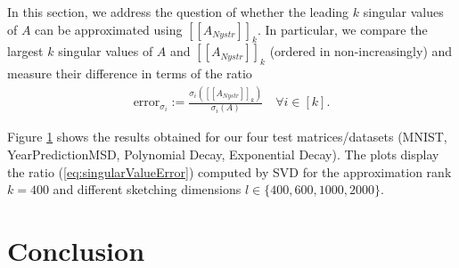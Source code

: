 \documentclass{article}
\theoremstyle{definition}
\begin{document}
In this section, we address the question of whether the leading $k$ singular values of $A$ can be approximated using $[\![A_{Nystr}]\!]_k$. In particular, we compare the largest $k$ singular values of $A$ and $[\![A_{Nystr}]\!]_k$ (ordered in non-increasingly) and measure their difference in terms of the ratio
\begin{align}
    \label{eq:singularValueError}
    \text{error}_{\sigma_i} := \frac{\sigma_i([\![A_{Nystr}]\!]_k)}{\sigma_i(A)}
    \quad \forall i \in [k].
\end{align}

Figure \ref{} shows the results obtained for our four test matrices/datasets (MNIST, YearPredictionMSD, Polynomial Decay, Exponential Decay). The plots display the ratio (\ref{eq:singularValueError}) computed by SVD for the approximation rank $k=400$ and different sketching dimensions $l \in \{400, 600, 1000, 2000\}$.



\section{Conclusion}
\end{document}

